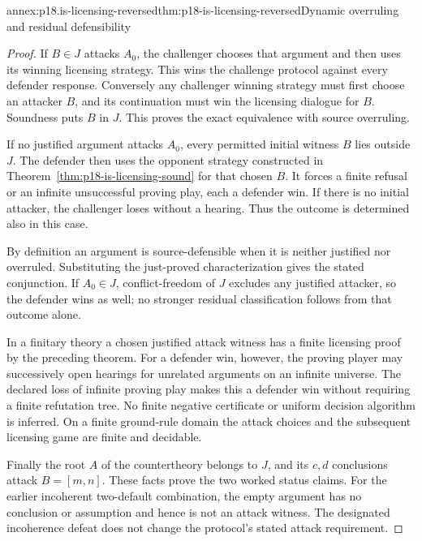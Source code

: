 \begin{annexitem}{annex:p18.is-licensing-reversed}{thm:p18-is-licensing-reversed}{Dynamic overruling and residual defensibility}
\begin{proof}
If \(B\in J\) attacks \(A_0\), the challenger chooses that
argument and then uses its winning licensing strategy.
This wins the challenge protocol against every defender response.
Conversely any challenger winning strategy must first choose
an attacker \(B\), and its continuation must win the licensing
dialogue for \(B\). Soundness puts \(B\) in \(J\).
This proves the exact equivalence with source overruling.

If no justified argument attacks \(A_0\), every permitted initial
witness \(B\) lies outside \(J\). The defender then uses the
opponent strategy constructed in
Theorem~\ref{thm:p18-is-licensing-sound} for that chosen \(B\).
It forces a finite refusal or an infinite unsuccessful proving
play, each a defender win. If there is no initial attacker,
the challenger loses without a hearing.
Thus the outcome is determined also in this case.

By definition an argument is source-defensible when it is
neither justified nor overruled. Substituting the just-proved
characterization gives the stated conjunction.
If \(A_0\in J\), conflict-freedom of \(J\) excludes any justified
attacker, so the defender wins as well; no stronger residual
classification follows from that outcome alone.

In a finitary theory a chosen justified attack witness has a
finite licensing proof by the preceding theorem.
For a defender win, however, the proving player may successively
open hearings for unrelated arguments on an infinite universe.
The declared loss of infinite proving play makes this a defender
win without requiring a finite refutation tree.
No finite negative certificate or uniform decision algorithm
is inferred. On a finite ground-rule domain the attack choices
and the subsequent licensing game are finite and decidable.

Finally the root \(A\) of the countertheory belongs to \(J\),
and its \(c,d\) conclusions attack \(B=[m,n]\).
These facts prove the two worked status claims.
For the earlier incoherent two-default combination, the empty
argument has no conclusion or assumption and hence is not
an attack witness. The designated incoherence defeat does
not change the protocol's stated attack requirement.
\end{proof}
\end{annexitem}
